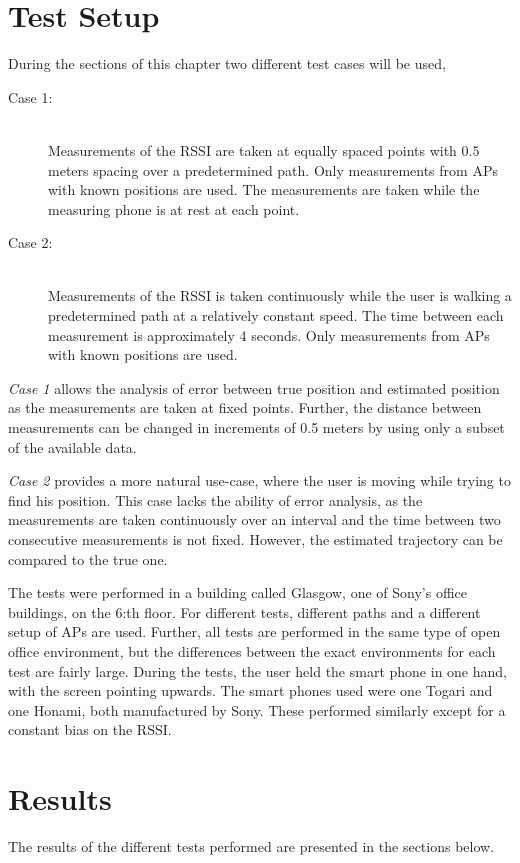 \documentclass{LTHthesis}
\begin{document}
%
\section{Test Setup}
\label{sec:test_setup}
%
During the sections of this chapter two different test cases will be used,
\begin{description}
%
\item[Case 1:] \hfill \\
%
Measurements of the RSSI are taken at equally spaced points with $0.5$ meters spacing over a predetermined path. Only measurements from APs with known positions are used. The measurements are taken while the measuring phone is at rest at each point.  
%
\item[Case 2:] \hfill \\
%
Measurements of the RSSI is taken continuously while the user is walking a predetermined path at a relatively constant speed. The time between each measurement is approximately 4 seconds. Only measurements from APs with known positions are used.  
%
\end{description}
%
\emph{Case 1} allows the analysis of error between true position and estimated position as the measurements are taken at fixed points. Further, the distance between measurements can be changed in increments of 0.5 meters by using only a subset of the available data. 

\emph{Case 2} provides a more natural use-case, where the user is moving while trying to find his position. This case lacks the ability of error analysis, as the measurements are taken continuously over an interval and the time between two consecutive measurements is not fixed. However, the estimated trajectory can be compared to the true one.   

The tests were performed in a building called Glasgow, one of Sony's office buildings, on the 6:th floor. For different tests, different paths and a different setup of APs are used. Further, all tests are performed in the same type of open office environment, but the differences between the exact environments for each test are fairly large. During the tests, the user held the smart phone in one hand, with the screen pointing upwards. The smart phones used were one Togari and one Honami, both manufactured by Sony. These performed similarly except for a constant bias on the RSSI.
%
\section{Results}
\label{environment_results}
%
The results of the different tests performed are presented in the sections below. 
%
\end{document}
